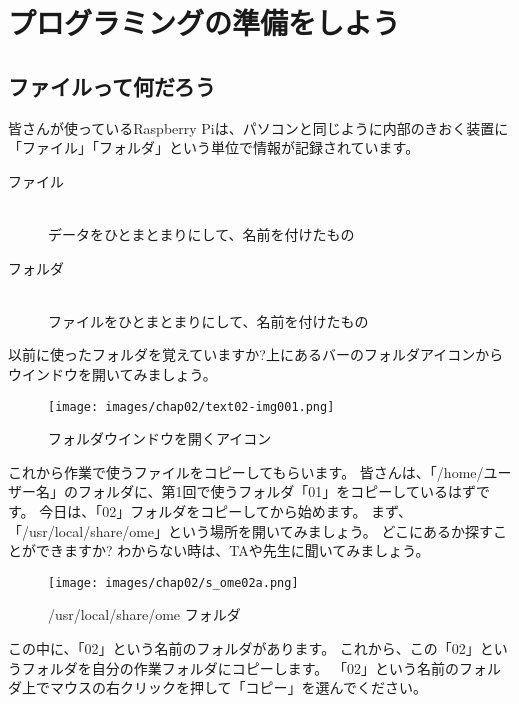 \clearpage
\section{プログラミングの準備をしよう}
\subsection{ファイルって何だろう}

皆さんが使っているRaspberry Piは、パソコンと同じように内部のきおく装置に
「ファイル」「フォルダ」という単位で情報が記録されています。
\begin{description}
  \item[ファイル]\mbox{}\\
  データをひとまとまりにして、名前を付けたもの
  \item[フォルダ]\mbox{}\\
  ファイルをひとまとまりにして、名前を付けたもの
\end{description}
  

以前に使ったフォルダを覚えていますか?上にあるバーのフォルダアイコンからウインドウを開いてみましょう。

\begin{figure}[H]
  \begin{center}
    \texttt{[image: images/chap02/text02-img001.png]}
    \caption{フォルダウインドウを開くアイコン}
  \end{center}
  \label{fig:folder_icon}
\end{figure}

これから作業で使うファイルをコピーしてもらいます。
皆さんは、「/home/ユーザー名」のフォルダに、第1回で使うフォルダ「01」をコピーしているはずです。
今日は、「02」フォルダをコピーしてから始めます。
まず、「/usr/local/share/ome」という場所を開いてみましょう。
どこにあるか探すことができますか?
わからない時は、TAや先生に聞いてみましょう。

\begin{figure}[H]
  \begin{center}
    \texttt{[image: images/chap02/s\_ome02a.png]}
    \caption{/usr/local/share/ome フォルダ}
  \end{center}
  \label{fig:folder_ome}
\end{figure}

\noindent
この中に、「02」という名前のフォルダがあります。
これから、この「02」というフォルダを自分の作業フォルダにコピーします。
「02」という名前のフォルダ上でマウスの右クリックを押して「コピー」を選んでください。

